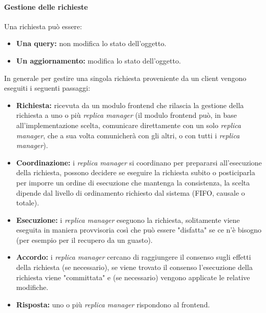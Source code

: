 \documentclass{article}
\begin{document}
\paragraph{Gestione delle richieste}
Una richiesta può essere:
\begin{itemize}
    \item \textbf{Una query:} non modifica lo stato dell'oggetto.
    \item \textbf{Un aggiornamento:} modifica lo stato dell'oggetto.
\end{itemize}
In generale per gestire una singola richiesta proveniente da un client vengono eseguiti i seguenti passaggi:
\begin{itemize}
    \item \textbf{Richiesta:} ricevuta da un modulo frontend che rilascia la gestione della richiesta a uno o più \textit{replica manager} (il modulo frontend può, in base all'implementazione scelta, comunicare direttamente con un solo \textit{replica manager}, che a sua volta comunicherà con gli altri, o con tutti i \textit{replica manager}).
    \item \textbf{Coordinazione:} i \textit{replica manager} si coordinano per prepararsi all'esecuzione della richiesta, possono decidere se eseguire la richiesta subito o posticiparla per imporre un ordine di esecuzione che mantenga la consistenza, la scelta dipende dal livello di ordinamento richiesto dal sistema (FIFO, causale o totale).
    \item \textbf{Esecuzione:} i \textit{replica manager} eseguono la richiesta, solitamente viene eseguita in maniera provvisoria così che può essere "disfatta" se ce n'è bisogno (per esempio per il recupero da un guasto).
    \item \textbf{Accordo:} i \textit{replica manager} cercano di raggiungere il consenso sugli effetti della richiesta (se necessario), se viene trovato il consenso l'esecuzione della richiesta viene "committata" e (se necessario) vengono applicate le relative modifiche.
    \item \textbf{Risposta:} uno o più \textit{replica manager} rispondono al frontend.
\end{itemize}
\end{document}
